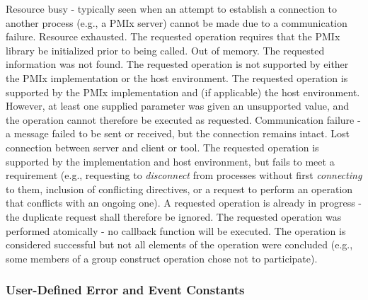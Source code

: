 \begin{constantdesc}
%
Resource busy - typically seen when an attempt to establish a connection
to another process (e.g., a \ac{PMIx} server) cannot be made due to a
communication failure.
%
Resource exhausted.
%
The requested operation requires that the \ac{PMIx} library be initialized prior to being called.
%
Out of memory.
%
The requested information was not found.
%
The requested operation is not supported by either the \ac{PMIx} implementation
or the host environment.
%
The requested operation is supported by the \ac{PMIx} implementation and (if applicable) the host environment. However, at least one supplied parameter was given an unsupported value, and the operation cannot therefore be executed as requested.
%
Communication failure - a message failed to be sent or received, but the
connection remains intact.
%
Lost connection between server and client or tool.
%
The requested operation is supported by the implementation and host environment, but fails to meet a requirement (e.g., requesting to \textit{disconnect} from processes without first \textit{connecting} to them, inclusion of conflicting directives, or a request to perform an operation that conflicts with an ongoing one).
%
A requested operation is already in progress - the duplicate request
shall therefore be ignored.
%
The requested operation was performed atomically - no callback function will be executed.
%
The operation is considered successful but not all elements of the operation were concluded (e.g., some members of a group construct operation chose not to participate).
%
\end{constantdesc}


\subsubsection{User-Defined Error and Event Constants}
\label{api:struct:usererrors}

